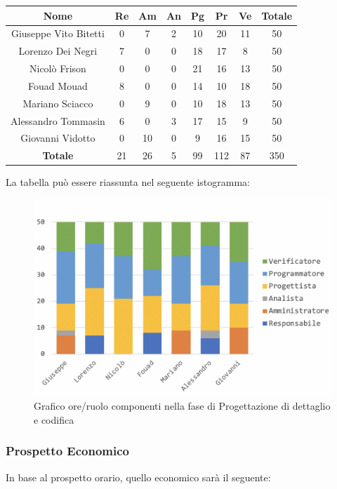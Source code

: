		\begin{longtable}{|c|c|c|c|c|c|c|c}
			\hline
			\rowcolor{lighter-grayer}
			\textbf{Nome} & \textbf{Re} & \textbf{Am} & \textbf{An} & \textbf{Pg}  & \textbf{Pr}   & \textbf{Ve} & \textbf{Totale} \\
			\hline
			\endfirsthead
			
			\hline
			Giuseppe Vito Bitetti 		& 0 & 7 & 2 & 10 & 20 & 11 & 50\\
			\hline
			\hline
			Lorenzo Dei Negri			& 7 & 0 & 0 & 18 & 17 & 8 & 50\\
			\hline
			\hline
			Nicolò Frison				    & 0 & 0 & 0 & 21 & 16 & 13 & 50\\
			\hline
			\hline
			Fouad Mouad 				 & 8 & 0 & 0 & 14 & 10 & 18 & 50\\
			\hline
			\hline
			Mariano Sciacco 			& 0 & 9 & 0 & 10 & 18 & 13 & 50\\
			\hline
			\hline
			Alessandro Tommasin    & 6 & 0 & 3 & 17 & 15 & 9 & 50\\
			\hline
			\hline
			Giovanni Vidotto 			 & 0 & 10 & 0 & 9 & 16 & 15 & 50\\
			\hline 
			\textbf{Totale}			 & 21 &  26 & 5 & 99 & 112 & 87 & 350\\
			\hline
		\end{longtable}
		\pagebreak
		
		La tabella può essere riassunta nel seguente istogramma:
		\begin{figure}[H]
			\centering
			\includegraphics[width=0.8\linewidth]{./images/progDetCod1.png}
			\caption{Grafico ore/ruolo componenti nella fase di Progettazione di dettaglio e codifica}
			\label{fig:grafico suddivione ruoli fase Progettazione dettaglio  e codifica}
		\end{figure}
	
		\subsubsection{Prospetto Economico}
		In base al prospetto orario, quello economico sarà il seguente: 
		
